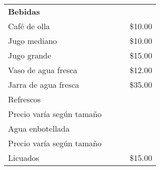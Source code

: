 \documentclass[12pt]{article}
\makeatletter
\newenvironment{Group}[1]
  {\noindent\begin{tabular*}{\textwidth}{@{}p{0.8\linewidth}@{\extracolsep{\fill}}r@{}}
    {\bfseries\large{#1}}\\[0.35em]}
  {\end{tabular*}}
\newcommand*\Entry[2]{%
  \sffamily#1 & #2}
\newcommand*\Expl[1]{%
  \hspace*{1em}\footnotesize #1}
\makeatother
\begin{document}
\begin{Group}{Bebidas}
\Entry{Café de olla}{\$10.00}\\
\Entry{Jugo mediano}{\$10.00}\\
\Entry{Jugo grande}{\$15.00}\\
\Entry{Vaso de agua fresca}{\$12.00}\\
\Entry{Jarra de agua fresca}{\$35.00}\\
\Entry{Refrescos}{}\\
\Expl{‬Precio varía según tamaño}\\
\Entry{Agua enbotellada}{}\\
\Expl{‬Precio varía según tamaño}\\
\Entry{Licuados}{\$15.00}
\end{Group}
\end{document}
